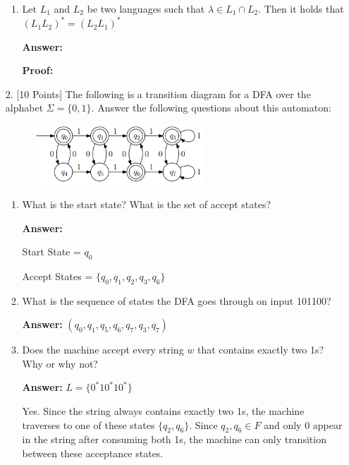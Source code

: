 \documentclass[12pt]{article}
\begin{document}
\begin{enumerate}
\begin{enumerate}
		      \item Let $L_1$ and $L_2$ be two languages such that $\lambda \in L_1 \cap L_2$. Then it holds that $(L_1L_2)^* = (L_2L_1)^*$

		            \noindent \textbf{Answer:}

		            \noindent \textbf{Proof:}

	      \end{enumerate}

	      \newpage

	\item[2.] [10 Points] The following is a transition diagram for a DFA over the alphabet $\Sigma = \{0,1\}$. Answer the following questions about this automaton:

	      \begin{figure}[h!]
		      \centering
		      \includegraphics[width=0.6\textwidth]{img/q2/q2_automata.png}
	      \end{figure}

	      \begin{enumerate}
		      \item What is the start state? What is the set of accept states?

		            \noindent \textbf{Answer:}

		            Start State = $q_0$

		            Accept States = $\{q_0, q_1, q_2, q_3, q_6\}$

		      \item What is the sequence of states the DFA goes through on input 101100?

		            \noindent \textbf{Answer:} $(q_0, q_1, q_5, q_6, q_7, q_3, q_7)$

		      \item Does the machine accept every string $w$ that contains exactly two 1s? Why or why not?

		            \noindent \textbf{Answer:} $L = \{0^*10^*10^* \}$

		            Yes. Since the string always contains exactly two 1s, the machine traverses to one of these states $\{q_2, q_6 \}$. Since $q_2, q_6 \in F$ and only 0 appear in the string after consuming both 1s, the machine can only transition between these acceptance states.


\end{enumerate}
\end{enumerate}
\end{document}

